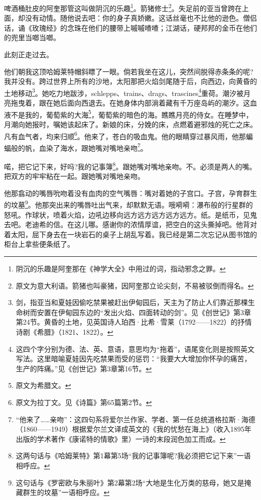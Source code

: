 \par 啤酒桶肚皮的阿奎那管这叫做阴沉的乐趣\footnote{阴沉的乐趣是阿奎那在《神学大全》中用过的词，指动邪念之罪。}。箭猪修士\footnote{原文为意大利语。箭猪也叫豪猪，因阿奎那立论尖刻，不易被驳倒而得名。}。失足前的亚当曾跨在上面，却没有动情。随他说去吧：你的身子真娇嫩。这话丝毫也不比他的逊色。僧侣话，诵《玫瑰经》的念珠在他们的腰带上嘁嘁喳喳；江湖话，硬邦邦的金币在他们的兜里当啷当啷。
\par 此刻正走过去。
\par 他们朝我这顶哈姆莱特帽斜瞟了一眼。倘若我坐在这儿，突然间脱得赤条条的呢?我并没有。跨过世界上所有的沙地，太阳那把火焰剑尾随于后，向西边，向黄昏的土地移动\footnote{剑，指亚当和夏娃因偷吃禁果被赶出伊甸园后，天主为了防止人们靠近那棵生命树而安置在伊甸园东边的“发出火焰、四面转动的剑”。见《创世记》第3章第24节。黄昏的土地，见英国诗人珀西·比希·雪莱（1792——1822）的抒情诗剧《希腊》（1821、1822）。}。她吃力地跋涉，schlepps、trains、drags、trascines\footnote{这四个字分别为德、法、英、意语，意思均为“拖着”，语尾变化则是按照英文写法。这里暗喻夏娃因先吃禁果而受的惩罚：“我要大大增加你怀孕的痛苦，生产的阵痛。”见《创世记》第3章第16节。}重荷。潮汐被月亮拖曳着，跟在她后面向西退去。在她身体内部淌着藏有千万座岛屿的潮汐。这血液不是我的，葡萄紫的大海\footnote{原文为希腊文。}，葡萄紫的暗色的海。瞧瞧月亮的侍女。在睡梦中，月潮向她报时，嘱她该起床了。新娘的床，分娩的床，点燃着避邪烛的死亡之床。凡有血气者，均来归顺\footnote{原文为拉丁文。见《诗篇》第65篇第2节。}。他来了，苍白的吸血鬼。他的眼睛穿过暴风雨，他那蝙蝠般的帆，血染了海水，跟她嘴对嘴地亲吻\footnote{“他来了……亲吻”：这四句系将爱尔兰作家、学者、第一任总统道格拉斯·海德（1860——1949）根据爱尔兰文译成英文的《我的忧愁在海上》（收入1895年出版的学术著作《康诺特的情歌》里）一诗的末段润色加工而成。}。
\par 喏，把它记下来，好吗?我的记事簿\footnote{这两句话与《哈姆莱特》第1幕第5场“我的记事簿呢?我必须把它记下来”一语相呼应。}。跟她嘴对嘴地亲吻。不。必须是两人的嘴。把双方的牢牢粘在一起。跟她嘴对嘴地亲吻。
\par 他那翕动的嘴唇吮吻着没有血肉的空气嘴唇：嘴对着她的子宫口。子宫，孕育群生的坟墓\footnote{这句话与《罗密欧与朱丽叶》第2幕第2场“大地是生化万类的慈母，她又是掩藏群生的坟墓”一语相呼应。}。他那突出来的嘴唇吐出气来，却默默无语。哦嗬嗬：瀑布般的行星群的怒吼。作球状，喷着火焰，边吼边移向远方远方远方远方远方。纸。是纸币，见鬼去吧。老迪希的信。在这儿哪。感谢你的浓情厚谊，把空白的这头撕掉吧。他背对着太阳，屈下身去在一块岩石的桌子上胡乱写着。我已经是第二次忘记从图书馆的柜台上拿些便条纸了。
